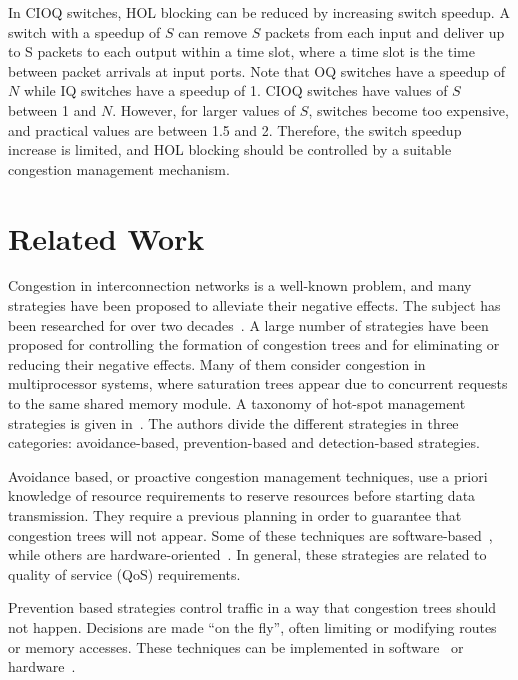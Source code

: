 \documentclass[12pt]{article}
\begin{document}
In CIOQ switches, HOL blocking can be reduced by increasing switch speedup\label{desc:switch_speedup}. A switch with a speedup of ${S}$ can remove ${S}$ packets from each input and deliver up to S packets to each output within a time slot, where a time slot is the time between packet arrivals at input ports. Note that OQ switches have a speedup of${N}$ while IQ switches have a speedup of 1. CIOQ switches have values of ${S}$ between 1 and ${N}$. However, for larger values of ${S}$, switches become too expensive, and practical values are between 1.5 and 2. Therefore, the switch speedup increase is limited, and HOL blocking should be controlled by a suitable congestion management mechanism.

\section{Related Work}\label{S:works}

Congestion in interconnection networks is a well-known problem, and many strategies have been proposed to alleviate their negative effects. The subject has been researched for over two decades~\cite{PN85}. A large number of strategies have been proposed for controlling the formation of congestion trees and for eliminating or reducing their negative effects. Many of them consider congestion in multiprocessor systems, where saturation trees appear due to concurrent requests to the same shared memory module. A taxonomy of hot-spot management strategies is given in~\cite{pD99}. The authors divide the different strategies in three categories: avoidance-based, prevention-based and detection-based strategies. 

Avoidance based, or proactive congestion management techniques, use a priori knowledge of resource requirements to reserve resources before starting data transmission. They require a previous planning in order to guarantee that congestion trees will not appear. Some of these techniques are software-based~\cite{BLKC93,YTL87}, while others are hardware-oriented~\cite{WSNA95}. In general, these strategies are related to quality of service (QoS) requirements.

Prevention based strategies control traffic in a way that congestion trees should not happen. Decisions are made “on the fly”, often limiting or modifying routes or memory accesses. These techniques can be implemented in software~\cite{HE89} or hardware~\cite{AG94,SS90}.
\end{document}
